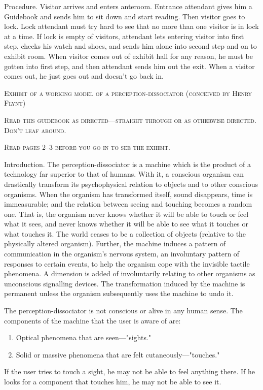 Procedure. Visitor arrives and enters anteroom. Entrance attendant 
gives him a Guidebook and sends him to sit down and start reading. Then 
visitor goes to lock. Lock attendant must try hard to see that no more than 
one visitor is in lock at a time. If lock is empty of visitors, attendant lets 
entering visitor into first step, checks his watch and shoes, and sends him 
alone into second step and on to exhibit room. When visitor comes out of 
exhibit hall for any reason, he must be gotten into first step, and then 
attendant sends him out the exit. When a visitor comes out, he just goes out 
and doesn't go back in. 



\clearpage

\textsc{Exhibit of a working model of a perception-dissociator (conceived by Henry Flynt)}




\textsc{Read this guidebook as directed---straight through or as otherwise directed. Don't leaf around.}


\textsc{Read pages 2--3 before you go in to see the exhibit.}

\clearpage

Introduction. The perception-dissociator is a machine which is the 
product of a technology far superior to that of humans. With it, a conscious 
organism can drastically transform its psychophysical relation to objects and 
to other conscious organisms. When the organism has transformed itself, 
sound disappears, time is immeasurable; and the relation between seeing and 
touching becomes a random one. That is, the organism never knows whether 
it will be able to touch or feel what it sees, and never knows whether it will 
be able to see what it touches or what touches it. The world ceases to be a 
collection of objects (relative to the physically altered organism). Further, 
the machine induces a pattern of communication in the organism's nervous 
system, an involuntary pattern of responses to certain events, to help the 
organism cope with the invisible tactile phenomena. A dimension is added of 
involuntarily relating to other organisms as unconscious signalling devices. 
The transformation induced by the machine is permanent unless the 
organism subsequently uses the machine to undo it. 


The perception-dissociator is not conscious or alive in any human sense. 
The components of the machine that the user is aware of are: 
\begin{enumerate}
	\item Optical phenomena that are seen---"sights." 
	\item Solid or massive phenomena that are felt cutaneously---"touches." 
\end{enumerate}
If the user tries to touch a sight, he may not be 
able to feel anything there. If he looks for a component that touches him, he 
may not be able to see it. 


